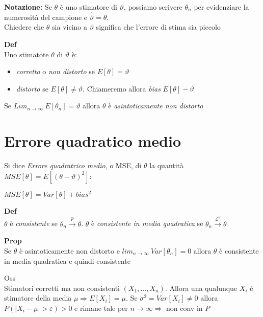 \documentclass[12pt, a4paper]{article}
\begin{document}
\textbf{Notazione:} Se $\theta$ è uno stimatore di $\vartheta$, possiamo scrivere $\theta_{n}$ per evidenziare la 
numerosità del campione e $\hat{\vartheta}=\theta$.\\ Chiedere che $\theta$ sia vicino a $\vartheta$ significa che 
l'errore di stima sia piccolo

\textbf{Def}\\Uno stimatote $\theta$ di $\vartheta$ è:
\begin{itemize}
    \item \textit{corretto} o \textit{non distorto} se $E[\theta]=\vartheta$
    \item \textit{distorto} se $E[\theta]\neq\vartheta$. Chiameremo allora \textit{bias} $E[\theta]-\vartheta$
\end{itemize}
Se $Lim_{n\to\infty}\ E[\theta_{n}]=\vartheta$ allora $\theta$ è \textit{asintoticamente non distorto}

\section{Errore quadratico medio}
Si dice \textit{Errore quadratrico medio}, o MSE, di $\theta$ la quantità $MSE[\theta]=E[(\theta-\vartheta)^{2}]$:
\begin{center}
    $MSE[\theta]=Var[\theta]+bias^{2}$
\end{center}

\textbf{Def}\\$\theta$ è \textit{consistente} se $\theta_{n}\xrightarrow{p}\theta$. $\theta$ è \textit{consistente
in media quadratica} se $\theta_{n}\xrightarrow{\mathcal{L}^{2}}\theta$

\textbf{Prop}\\Se $\theta$ è asintoticamente non distorto e $lim_{n\to\infty}\ Var[\theta_{n}]=0$ allora $\theta$
è consistente in media quadratica e quindi consistente

Oss\\ Stimatori corretti ma non consistenti $(X_{1},...,X_{n})$. Allora una qualunque $X_{i}$ è stimatore della
media $\mu\Rightarrow E[X_{i}]=\mu$. Se $\sigma^{2}=Var[X_{i}]\neq 0$ allora $P(|X_{i}-\mu|>\varepsilon)>0$ e 
rimane tale per $n\to\infty\Rightarrow$ non conv in $P$
\end{document}

